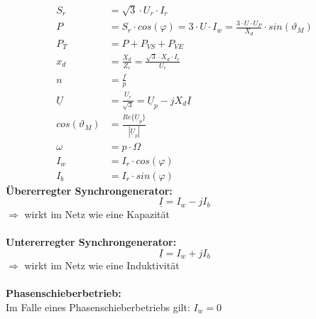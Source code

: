 \documentclass[a4paper,twocolumn,10pt]{article}
\begin{document}
\begin{equation*}
\begin{split}
S_r&=\sqrt{3}\cdot U_r\cdot I_r\\
P&=S_r\cdot cos(\varphi)=3\cdot U\cdot I_w=\frac{3\cdot U\cdot U_P}{X_d}\cdot sin(\vartheta_M)\\
P_T&=P+P_{VS}+P_{VE}\\
x_d&=\frac{X_d}{Z_r}=\frac{\sqrt{3}\cdot X_d\cdot I_r}{U_r}\\
n&=\frac{f}{p}\\
\underline{U}&=\frac{\underline{U_r}}{\sqrt{3}}=\underline{U}_p-jX_d\underline{I}\\
cos(\vartheta_M)&=\frac{Re\{\underline{U}_p\}}{|\underline{U}_p|}\\
\omega&=p\cdot\Omega\\
I_w&=I_r\cdot cos(\varphi)\\
I_b&=I_r\cdot sin(\varphi)
\end{split}
\end{equation*}
\textbf{Übererregter Synchrongenerator:}
\begin{equation*}
\underline{I}=I_w-jI_b
\end{equation*}
$\Rightarrow$ wirkt im Netz wie eine Kapazität\\\\
\textbf{Untererregter Synchrongenerator:}
\begin{equation*}
\underline{I}=I_w+jI_b
\end{equation*}
$\Rightarrow$ wirkt im Netz wie eine Induktivität\\\\
\textbf{Phasenschieberbetrieb:}\\
Im Falle eines Phasenschieberbetriebs gilt: $I_w=0$
\end{document}
